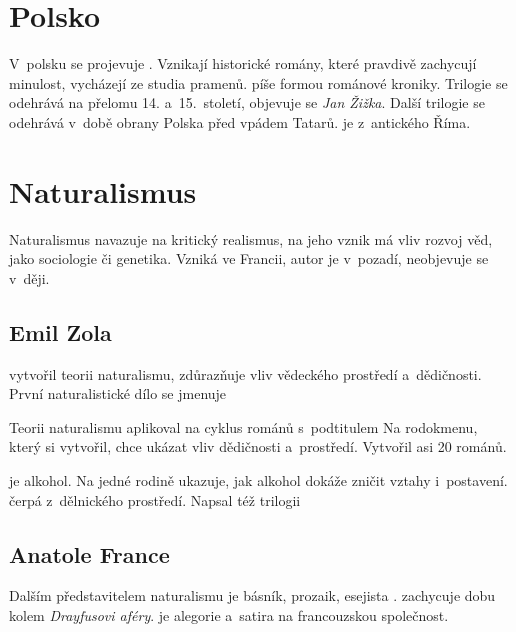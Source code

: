 \section{Polsko}
V~polsku se projevuje . Vznikají historické romány,
které pravdivě zachycují minulost, vycházejí ze studia pramenů.
 píše formou románové kroniky.
Trilogie  se odehrává na přelomu 14. a~15.~století,
objevuje se \emph{Jan Žižka}. Další trilogie 
se odehrává v~době obrany Polska před vpádem Tatarů.
 je z~antického Říma.

\section{Naturalismus}
Naturalismus navazuje na kritický realismus, na jeho vznik má vliv
rozvoj věd, jako sociologie či genetika. Vzniká ve Francii, autor je
v~pozadí, neobjevuje se v~ději.

\subsection*{Emil Zola}
 vytvořil teorii naturalismu, zdůrazňuje vliv vědeckého
prostředí a~dědičnosti. První naturalistické dílo se jmenuje

Teorii naturalismu aplikoval na cyklus románů 
s~podtitulem 
Na rodokmenu, který si vytvořil, chce ukázat vliv dědičnosti a~prostředí.
Vytvořil asi 20 románů.

 je alkohol. Na jedné rodině ukazuje, jak alkohol dokáže zničit
vztahy i~postavení.  čerpá z~dělnického prostředí.
Napsal též trilogii 

\subsection*{Anatole France}
Dalším představitelem naturalismu je básník, prozaik, esejista
.
 zachycuje dobu kolem \emph{Drayfusovi aféry}.
 je alegorie a~satira na francouzskou společnost.